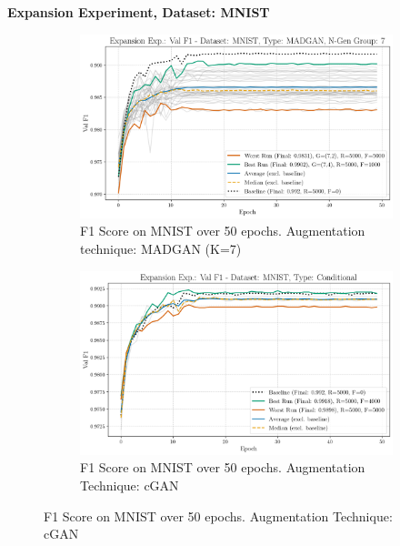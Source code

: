 \newpage
\noindent\textbf{Expansion Experiment, Dataset: MNIST}
\begin{figure}[H]
	\centering
	\begin{subfigure}{.85\textwidth}
		\includegraphics[width=\textwidth]{abb/strat_classifier_performance/MNIST_STRATIFIED_CLASSIFIERS_MADGAN_NEW/expansion_experiments/val_f1_score_MADGAN_MNIST_n_gen_7_all.png}
		\caption{F1 Score on MNIST over 50 epochs. Augmentation technique: MADGAN (K=7)}
        \label{fig:res_expansion_mnist_ccgan_vs_madgan__madgan}
	\end{subfigure}
	\begin{subfigure}{.85\textwidth}
		\includegraphics[width=\textwidth]{abb/strat_classifier_performance/MNIST_STRATIFIED_CLASSIFIERS_COND_GAN/expansion_experiments/val_f1_score_['COND']_MNIST_all.png}
		\caption{F1 Score on MNIST over 50 epochs. Augmentation Technique: cGAN}
        \label{fig:res_expansion_mnist_ccgan_vs_madgan__cgan}
	\end{subfigure}
\end{figure}


